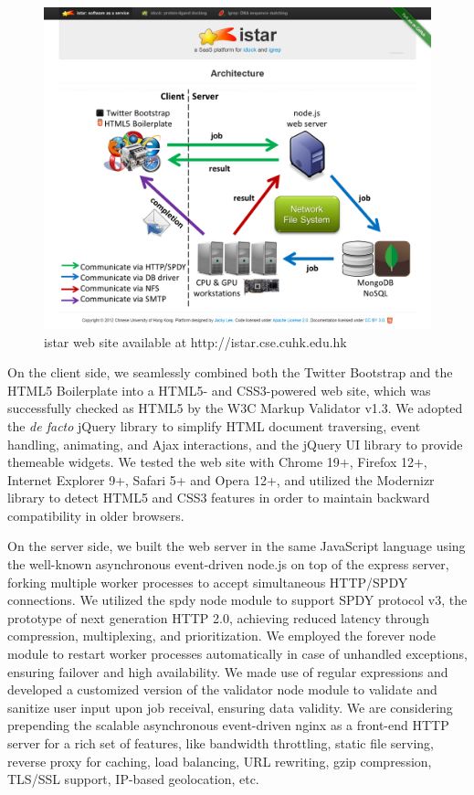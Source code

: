 \begin{figure}
\centering
\includegraphics[width=\linewidth]{istar/istar.png}
\caption{istar web site available at http://istar.cse.cuhk.edu.hk}
\label{istar:istar}
\end{figure}

On the client side, we seamlessly combined both the Twitter Bootstrap and the HTML5 Boilerplate into a HTML5- and CSS3-powered web site, which was successfully checked as HTML5 by the W3C Markup Validator v1.3. We adopted the \textit{de facto} jQuery library to simplify HTML document traversing, event handling, animating, and Ajax interactions, and the jQuery UI library to provide themeable widgets. We tested the web site with Chrome 19+, Firefox 12+, Internet Explorer 9+, Safari 5+ and Opera 12+, and utilized the Modernizr library to detect HTML5 and CSS3 features in order to maintain backward compatibility in older browsers.

On the server side, we built the web server in the same JavaScript language using the well-known asynchronous event-driven node.js on top of the express server, forking multiple worker processes to accept simultaneous HTTP/SPDY connections. We utilized the spdy node module to support SPDY protocol v3, the prototype of next generation HTTP 2.0, achieving reduced latency through compression, multiplexing, and prioritization. We employed the forever node module to restart worker processes automatically in case of unhandled exceptions, ensuring failover and high availability. We made use of regular expressions and developed a customized version of the validator node module to validate and sanitize user input upon job receival, ensuring data validity. We are considering prepending the scalable asynchronous event-driven nginx as a front-end HTTP server for a rich set of features, like bandwidth throttling, static file serving, reverse proxy for caching, load balancing, URL rewriting, gzip compression, TLS/SSL support, IP-based geolocation, etc.


